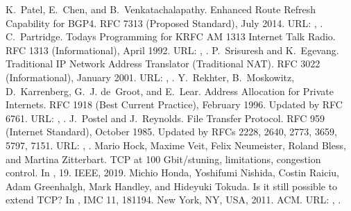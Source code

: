 \documentclass[letterpaper,10pt,english]{sphinxmanual}
\begin{document}
\begin{sphinxthebibliography}{10}
\sphinxAtStartPar
K. Patel, E. Chen, and B. Venkatachalapathy. Enhanced Route Refresh Capability for BGP\sphinxhyphen{}4. RFC 7313 (Proposed Standard), July 2014. URL: , .
\sphinxAtStartPar
C. Partridge. Today\textquotesingle{}s Programming for KRFC AM 1313 Internet Talk Radio. RFC 1313 (Informational), April 1992. URL: , .
\sphinxAtStartPar
P. Srisuresh and K. Egevang. Traditional IP Network Address Translator (Traditional NAT). RFC 3022 (Informational), January 2001. URL: , .
\sphinxAtStartPar
Y. Rekhter, B. Moskowitz, D. Karrenberg, G. J. de Groot, and E. Lear. Address Allocation for Private Internets. RFC 1918 (Best Current Practice), February 1996. Updated by RFC 6761. URL: , .
\sphinxAtStartPar
J. Postel and J. Reynolds. File Transfer Protocol. RFC 959 (Internet Standard), October 1985. Updated by RFCs 2228, 2640, 2773, 3659, 5797, 7151. URL: , .
\sphinxAtStartPar
Mario Hock, Maxime Veit, Felix Neumeister, Roland Bless, and Martina Zitterbart. TCP at 100 Gbit/s\textendash{}tuning, limitations, congestion control. In , 1\textendash{}9. IEEE, 2019.
\sphinxAtStartPar
Michio Honda, Yoshifumi Nishida, Costin Raiciu, Adam Greenhalgh, Mark Handley, and Hideyuki Tokuda. Is it still possible to extend TCP? In , IMC \textquotesingle{}11, 181\textendash{}194. New York, NY, USA, 2011. ACM. URL: , .
\end{sphinxthebibliography}



\renewcommand{\indexname}{Index}
\printindex
\end{document}
